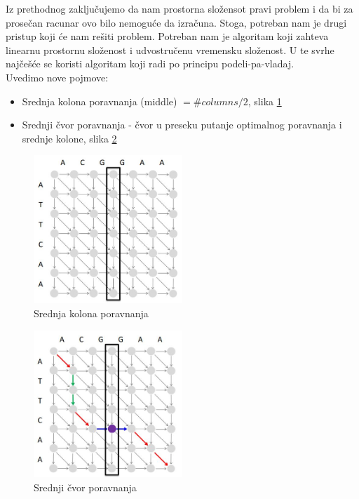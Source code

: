 Iz prethodnog zaključujemo da nam prostorna složensot pravi problem i da bi za prosečan racunar ovo bilo nemoguće da izračuna.
Stoga, potreban nam je drugi pristup koji će nam rešiti problem. Potreban nam je algoritam koji zahteva linearnu prostornu složenost i udvostručenu vremensku složenost. U te svrhe najčešće se koristi algoritam koji radi po principu podeli-pa-vladaj. \\

Uvedimo nove pojmove:
\begin{itemize}
    \item Srednja kolona poravnanja (middle) $= \#columns/2$, slika \ref{slika:srednjaKolona}
    \item Srednji čvor poravnanja - čvor u preseku putanje optimalnog poravnanja i srednje kolone, slika \ref{slika:srednjiCvor}
\end{itemize}


\begin{figure}[h]
\centering
\includegraphics[width=0.5\textwidth]{poglavlja/5/slike/srednjaKolona.JPG}
\caption{Srednja kolona poravnanja}
\label{slika:srednjaKolona}
\end{figure}

\begin{figure}[h]
\centering
\includegraphics[width=0.5\textwidth]{poglavlja/5/slike/srednjiCvor.JPG}
\caption{Srednji čvor poravnanja}
\label{slika:srednjiCvor}
\end{figure}

